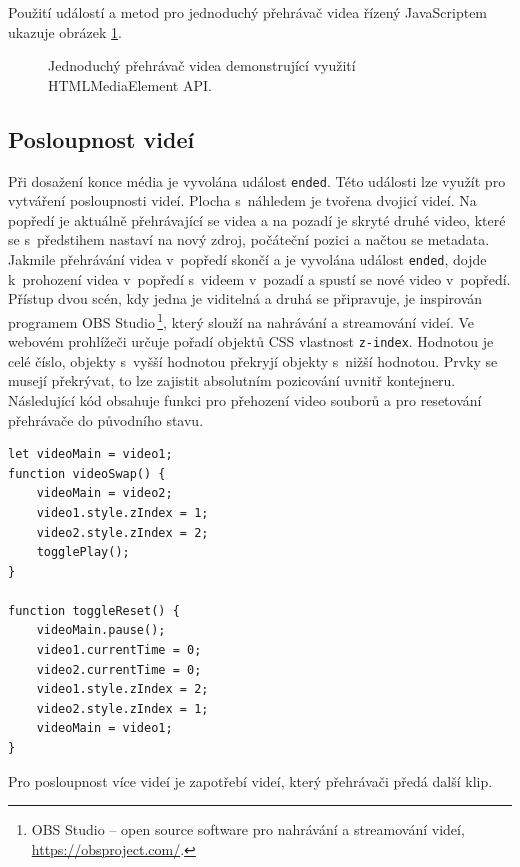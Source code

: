 Použití událostí a metod pro jednoduchý přehrávač videa řízený JavaScriptem ukazuje obrázek \ref{img:html-control}.

\begin{figure}[h]
	\centering
	\caption{Jednoduchý přehrávač videa demonstrující využití HTMLMediaElement API.}\label{img:html-control}
\end{figure}

\subsection{Posloupnost videí}
Při dosažení konce média je vyvolána událost \texttt{ended}. Této události lze využít pro vytváření posloupnosti videí. Plocha s~náhledem je tvořena dvojicí videí. Na popředí je aktuálně přehrávající se videa a na pozadí je skryté druhé video, které se s~předstihem nastaví na nový zdroj, počáteční pozici a načtou se metadata. Jakmile přehrávání videa v~popředí skončí a je vyvolána událost \texttt{ended}, dojde k~prohození videa v~popředí s~videem v~pozadí a spustí se nové video v~popředí. Přístup dvou scén, kdy jedna je viditelná a druhá se připravuje, je inspirován programem OBS Studio\,\footnote{OBS Studio -- open source software pro nahrávání a streamování videí, \url{https://obsproject.com/}.}, který slouží na nahrávání a streamování videí. Ve webovém prohlížeči určuje pořadí objektů CSS vlastnost \texttt{z-index}. Hodnotou je celé číslo, objekty s~vyšší hodnotou překryjí objekty s~nižší hodnotou. Prvky se musejí překrývat, to lze zajistit absolutním pozicování uvnitř kontejneru. Následující kód obsahuje funkci pro přehození video souborů a pro resetování přehrávače do původního stavu.
\begin{lstlisting}[style=JavaScript]
let videoMain = video1;
function videoSwap() {
    videoMain = video2;
    video1.style.zIndex = 1;
    video2.style.zIndex = 2;
    togglePlay();
}

function toggleReset() {
    videoMain.pause();
    video1.currentTime = 0;
    video2.currentTime = 0;
    video1.style.zIndex = 2;
    video2.style.zIndex = 1;
    videoMain = video1;
}
\end{lstlisting}
Pro posloupnost více videí je zapotřebí  videí, který přehrávači předá další klip.

